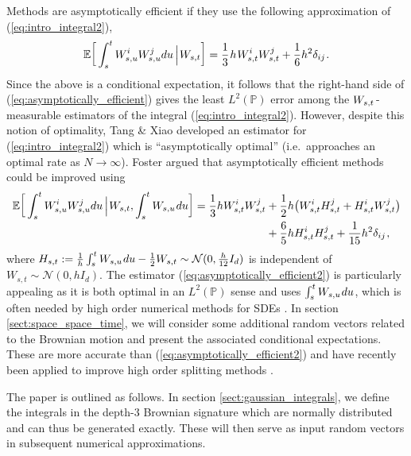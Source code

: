 \documentclass[sn-mathphys-num]{sn-jnl}%
\newcommand{\E}{\mathbb{E}}
\renewcommand{\P}{\mathbb{P}}
\newcommand{\m}{\hspace{0.25mm}}
\begin{document}
Methods are asymptotically efficient if they use the following approximation of (\ref{eq:intro_integral2}),
\begin{align}\label{eq:asymptotically_efficient}
\E\bigg[ \int_s^t W_{s,u}^iW_{s,u}^j du\,\Big|\m W_{s,t}\bigg] = \frac{1}{3}\m h\m W_{s,t}^{i}W_{s,t}^{j} + \frac{1}{6}h^2\delta_{ij}\m.
\end{align}
Since the above is a conditional expectation, it follows that the right-hand side of (\ref{eq:asymptotically_efficient}) gives the least $L^2(\P)$ error among the $W_{s,t}\m$-measurable estimators of the integral (\ref{eq:intro_integral2}).
However, despite this notion of optimality, Tang \& Xiao \cite{tang2019sdes} developed an estimator for (\ref{eq:intro_integral2}) which is ``asymptotically optimal'' (i.e.~approaches an optimal rate as $N\rightarrow\infty$).
Foster \cite{foster2020thesis, foster2020poly} argued that asymptotically efficient methods could be improved using
\begin{align}\label{eq:asymptotically_efficient2}
\E\bigg[\int_s^t W_{s,u}^i W_{s,u}^j du\,\Big|\m W_{s,t}, \int_s^t W_{s,u} \m du\bigg] = \frac{1}{3}hW_{s,t}^i W_{s,t}^j & + \frac{1}{2}h\big(W_{s,t}^i H_{s,t}^j + H_{s,t}^i W_{s,t}^j\big)\nonumber\\[-2pt]
& + \frac{6}{5}hH_{s,t}^i H_{s,t}^j + \frac{1}{15}h^2 \delta_{ij}\m,
\end{align}
where $H_{s,t} := \frac{1}{h}\int_s^t W_{s,u} \m du - \frac{1}{2}W_{s,t}\sim\mathcal{N}(0,\frac{h}{12}I_d)$ is independent of $W_{s,t}\sim\mathcal{N}(0,h I_d)$.\vspace{1.5mm}
The estimator (\ref{eq:asymptotically_efficient2}) is particularly appealing as it is both optimal in an $L^2(\P)$ sense and uses $\int_s^t W_{s,u} \m du$, which is often needed by high order numerical methods for SDEs \cite{jelincic2024vbt}.
In section \ref{sect:space_space_time}, we will consider some additional random vectors related to the Brownian motion
and present the associated conditional expectations. These are more accurate than (\ref{eq:asymptotically_efficient2}) and have recently been applied to improve high order splitting methods \cite{foster2024splitting}.\medbreak

The paper is outlined as follows. In section \ref{sect:gaussian_integrals}, we define the integrals in the depth-$3$ Brownian signature which are normally distributed and can thus be generated exactly. These will then serve as input random vectors in subsequent numerical approximations.\medbreak
\end{document}

